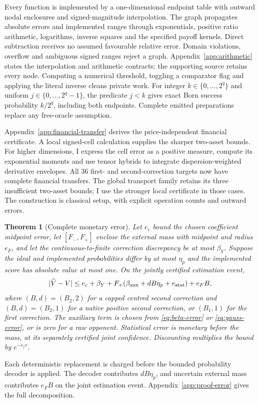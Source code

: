 \documentclass[11pt]{article}
\newtheorem{theorem}{Theorem}[section]
\begin{document}
Every function is implemented by a one-dimensional endpoint table with
outward nodal enclosures and signed-magnitude interpolation. The graph
propagates absolute errors and implemented ranges through exponentials,
positive ratio arithmetic, logarithms, inverse squares and the specified
payoff kernels. Direct subtraction receives no assumed favourable relative
error. Domain violations, overflow and ambiguous signed ranges reject a
graph. Appendix~\ref{app:arithmetic} states the interpolation and arithmetic
contracts; the supporting source retains every node. Computing a numerical
threshold, toggling a comparator flag and applying the literal inverse
cleans private work. For integer $k\in\{0,\ldots,2^q\}$ and uniform
$j\in\{0,\ldots,2^q-1\}$, the predicate $j<k$ gives exact Born success
probability $k/2^q$, including both endpoints. Complete emitted preparations
replace any free-oracle assumption.

Appendix~\ref{app:financial-transfer} derives the price-independent
financial certificate. A local signed-cell calculation supplies the
sharper two-asset bounds. For higher dimensions, I express the cell error
as a positive measure, compute its exponential moments and use tensor
hybrids to integrate dispersion-weighted derivative envelopes. All 36
first- and second-correction targets now have complete financial transfers.
The global transport family retains its three insufficient two-asset bounds;
I use the stronger local certificate in those cases. The construction is
classical setup, with explicit operation counts and outward errors.

\begin{theorem}[Complete monetary error]
\label{thm:error}
Let $e_c$ bound the chosen coefficient midpoint error, let
$[F_-,F_+]$ enclose the external mass with midpoint and radius $e_F$, and
let the continuous-to-finite correction discrepancy be at most $\beta_Y$.
Suppose the ideal and implemented probabilities differ by at most $\eta_p$
and the implemented score has absolute value at most one. On the jointly
certified estimation event,
\begin{equation}
 |\widehat V-V|\leq e_c+\beta_Y+
 F_+(\beta_{\rm aux}+dB\eta_p+e_{\rm stat})+e_FB,
 \label{eq:total-error}
\end{equation}
where $(B,d)=(B_2,2)$ for a capped centred second correction and
$(B,d)=(B_2,1)$ for a native positive second correction, or $(B_1,1)$ for
the first correction. The auxiliary term is chosen from
\eqref{eq:beta-error} or \eqref{eq:gauss-error}, or is zero for a raw
opponent. Statistical error is monetary before the mass, at its separately
certified joint confidence. Discounting multiplies the bound by
$e^{-r_f\tau}$.
\end{theorem}
Each deterministic replacement is charged before the bounded probability decoder is applied. The decoder contributes $dB\eta_p$, and uncertain external mass contributes $e_FB$ on the joint estimation event. Appendix~\ref{app:proof-error} gives the full decomposition.
\end{document}
